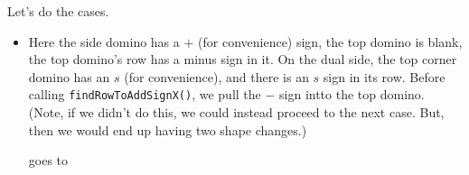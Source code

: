 \documentclass[12pt]{article}
\numberwithin{equation}{section}
\newcommand{\horizontalDominoRSShift}[4]{\filldraw [dominoRSStyle] (#2 - 1 + #4 + \eps, #1 - 1 + \eps) rectangle + (2 - \teps, 1 -\teps) node [dominoText] {$#3$};}
\newcommand{\verticalDominoRSShift}[4]{\filldraw [dominoRSStyle] (#2 - 1 + #4 + \eps,  #1 - 1 + \eps) rectangle + (1 - \teps,2 -\teps) node [dominoText] {$#3$};}
\begin{document}
\begin{itemize}
\begin{itemize}
\begin{itemize}
        Let's do the cases.
        \begin{itemize}
          \item Here the side domino has a $+$ (for convenience) sign, the top domino is blank, the top domino's row has a minus sign in it.
          On the dual side, the top corner domino has an $s$ (for convenience), and there is an $s$ sign in its row.
          Before calling  \texttt{findRowToAddSignX()}, we pull the $-$ sign intto the top domino.
          (Note, if we didn't do this, we could instead proceed to the next case.
          But, then we would end up having two shape changes.)
          \begin{figure}[H]
            \centering
          \end{figure}
          goes to
          \begin{figure}[H]
            \centering
\end{figure}
\end{itemize}
\end{itemize}
\end{itemize}
\end{itemize}
\end{document}
